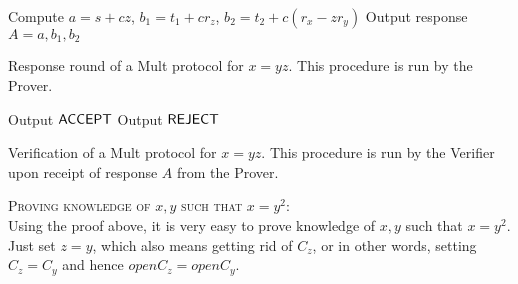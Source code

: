 \begin{algorithm}[H]\label{respondUnknownMultiply}
\dontprintsemicolon

\BlankLine

 \;
\Indp
  Compute $a = s + c z$, $b_1 = t_1 + c r_z$, $b_2 = t_2 + c(r_x - z r_y)$ \;
  Output response $A = a,b_1,b_2$ \;
\Indm

\caption{Response round of a Mult protocol for $x = yz$. This procedure is run by the Prover.}
\end{algorithm}






\begin{algorithm}[H]\label{verifyUnknownMultiply}
\dontprintsemicolon

\BlankLine

 \;
\Indp
    {Output $\mathsf{ACCEPT}$ \;}
  \Else
    {Output $\mathsf{REJECT}$ \;}
\Indm

\caption{Verification of a Mult protocol for $x = yz$. This procedure is run by the Verifier upon receipt of response $A$ from the Prover.}
\end{algorithm}




\textsc{Proving knowledge of $x,y$ such that $ x = y^2 $}:\\
Using the proof above, it is very easy to prove knowledge of $x,y$ such that $ x = y^2 $. Just set $ z = y $, which also means getting rid of $ C_z $, or in other words, setting $ C_z = C_y $ and hence $ openC_z = openC_y $.
